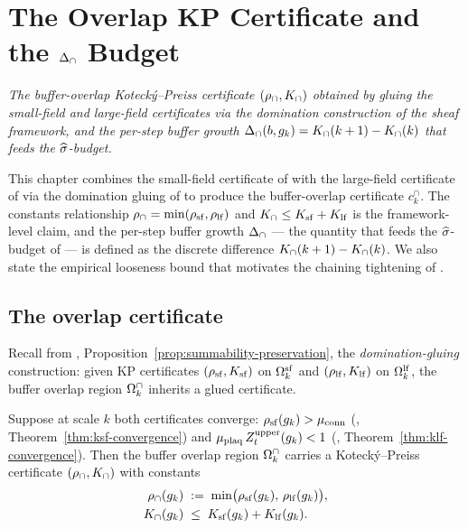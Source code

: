 %

\chapter{The Overlap KP Certificate and the
  \texorpdfstring{$\Delta_{\cap}$}{Delta\_cap} Budget}
\label{ch:overlap-kp}

\noindent\emph{The buffer-overlap Kotecký--Preiss certificate
$(\rho_{\cap}, K_{\cap})$ obtained by gluing the small-field and
large-field certificates via the domination construction of the
sheaf framework, and the per-step buffer growth $\Delta_{\cap}(b, g_k) =
K_{\cap}(k+1) - K_{\cap}(k)$ that feeds the $\widehat{\sigma}$-budget.}

This chapter combines the small-field certificate of
 with the large-field certificate of
 via the domination gluing of
 to produce the buffer-overlap certificate
$c_k^{\cap}$.  The constants relationship
$\rho_{\cap} = \min(\rho_{\mathrm{sf}}, \rho_{\mathrm{lf}})$ and $K_{\cap} \le K_{\mathrm{sf}} + K_{\mathrm{lf}}$ is the
framework-level claim, and the per-step buffer growth $\Delta_{\cap}$ — the
quantity that feeds the $\widehat{\sigma}$-budget of
 — is defined as the discrete
difference $K_{\cap}(k+1) - K_{\cap}(k)$.  We also state the empirical
looseness bound that motivates the chaining tightening of
.

\section{The overlap certificate}
\label{sec:overlap-certificate}

%

Recall from ,
Proposition~\ref{prop:summability-preservation}, the
\emph{domination-gluing} construction: given KP certificates
$(\rho_{\mathrm{sf}}, K_{\mathrm{sf}})$ on $\Omega_k^{\mathrm{sf}}$ and $(\rho_{\mathrm{lf}}, K_{\mathrm{lf}})$ on $\Omega_k^{\mathrm{lf}}$, the
buffer overlap region $\Omega_k^{\cap}$ inherits a glued certificate.

\begin{theorem}
\label{thm:overlap-glue}
Suppose at scale $k$ both certificates converge: $\rho_{\mathrm{sf}}(g_k) >
\mu_{\mathrm{conn}}$ (,
Theorem~\ref{thm:ksf-convergence}) and
$\mu_{\mathrm{plaq}}\,Z_t^{\mathrm{upper}}(g_k) < 1$ (,
Theorem~\ref{thm:klf-convergence}).  Then the buffer overlap region
$\Omega_k^{\cap}$ carries a Kotecký--Preiss certificate $(\rho_{\cap}, K_{\cap})$
with constants
\begin{align}
  \label{eq:rho-cap}
  \rho_{\cap}(g_k) &\;:=\; \min\bigl(\rho_{\mathrm{sf}}(g_k),\, \rho_{\mathrm{lf}}(g_k)\bigr), \\
  \label{eq:k-cap}
  K_{\cap}(g_k) &\;\le\; K_{\mathrm{sf}}(g_k) + K_{\mathrm{lf}}(g_k) .
\end{align}
\end{theorem}

